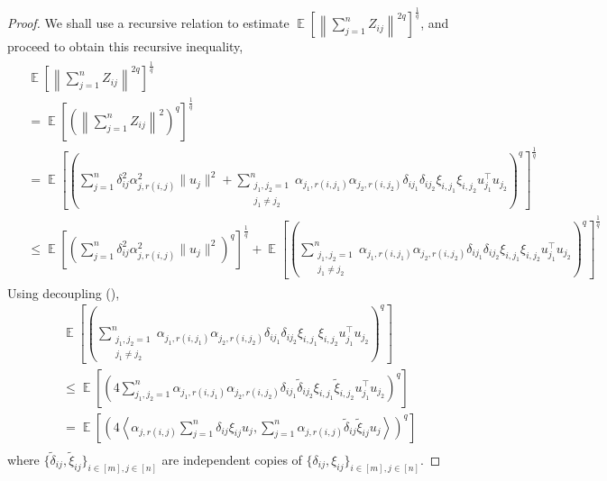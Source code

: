 \documentclass[11pt]{amsart}
\numberwithin{equation}{section}
\numberwithin{equation}{section}
\DeclareMathOperator{\E}{\mathbb{E}}
\theoremstyle{remark}
\theoremstyle{definition}
\begin{document}
\begin{proof}
We shall use a recursive relation to estimate $\E \left[ \left\|\sum_{j=1}^n  Z_{ij} \right\|^{2q} \right]^\frac{1}{q}$, and proceed to obtain this recursive inequality,
    \begin{align} 
    \begin{split} 
        &\E \left[ \left\|\sum_{j=1}^n  Z_{ij} \right\|^{2q} \right]^\frac{1}{q} \\
        &= \E \left[ \left ( \left\|\sum_{j=1}^n  Z_{ij} \right\|^{2} \right)^q \right]^\frac{1}{q} \\
        &= \E \left[ \left ( \sum_{j=1}^n \delta_{ij}^2 \alpha^2_{j,r(i,j)} \| u_j \| ^2 + \sum_{ \substack{j_1,j_2 =1 \\ j_1 \neq j_2} }^n \alpha_{j_1,r(i,j_1)}\alpha_{j_2,r(i,j_2)} \delta_{ij_1} \delta_{ij_2} \xi_{i,j_1} \xi_{i,j_2} u_{j_1}^\top u_{j_2}  \right)^q \right]^\frac{1}{q} \\
        &\le \E \left[ \left ( \sum_{j=1}^n \delta_{ij}^2 \alpha^2_{j,r(i,j)} \| u_j \| ^2 \right)^q \right]^\frac{1}{q} +
        \E \left[ \left ( \sum_{ \substack{j_1,j_2 =1 \\ j_1 \neq j_2} }^n \alpha_{j_1,r(i,j_1)}\alpha_{j_2,r(i,j_2)} \delta_{ij_1} \delta_{ij_2} \xi_{i,j_1} \xi_{i,j_2} u_{j_1}^\top u_{j_2}  \right)^q \right]^\frac{1}{q} \label{eq:rnormrecur}
    \end{split}
    \end{align}
    Using decoupling (\cite[Theorem 6.1.1]{vershynin2018high}), 
    \begin{align*}
        &\E \left[ \left ( \sum_{ \substack{j_1,j_2 =1 \\ j_1 \neq j_2} }^n \alpha_{j_1,r(i,j_1)}\alpha_{j_2,r(i,j_2)} \delta_{ij_1} \delta_{ij_2} \xi_{i,j_1} \xi_{i,j_2} u_{j_1}^\top u_{j_2}  \right)^q \right] \\
        &\le \E \left[ \left ( 4 \sum_{ j_1,j_2 =1  }^n \alpha_{j_1,r(i,j_1)}\alpha_{j_2,r(i,j_2)} \delta_{ij_1} \widetilde{\delta}_{ij_2} \xi_{i,j_1} \widetilde{\xi}_{i,j_2} u_{j_1}^\top u_{j_2}  \right)^q \right] \\
        &= \E \left[ \left ( 4 \left\langle \alpha_{j,r(i,j)} \sum_{j=1}^n \delta_{ij} \xi_{ij} u_{j}, \sum_{j=1}^n \alpha_{j,r(i,j)} \widetilde{\delta}_{ij} \widetilde{\xi}_{ij} u_{j} \right\rangle  \right)^q \right] \\
    \end{align*}
    where $\{ \widetilde{\delta}_{ij}, \widetilde{\xi}_{ij} \}_{i \in [m], j \in [n]}$ are independent copies of $\{ {\delta}_{ij}, {\xi}_{ij} \}_{i \in [m], j \in [n]}$.
    

\end{proof}
\end{document}
